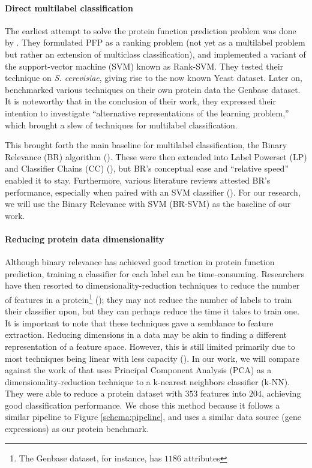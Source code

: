 \paragraph{Direct multilabel classification} The earliest attempt to solve
the protein function prediction problem was done by
\cite{elisseeff2001kernel}. They formulated PFP as a ranking problem (not yet
as a multilabel problem but rather an extension of multiclass
classification), and implemented a variant of the support-vector machine
(SVM) known as Rank-SVM. They tested their technique on \textit{S.
cerevisiae}, giving rise to the now known Yeast dataset. Later on,
\cite{diplaris2005protein} benchmarked various techniques on their own
protein data \textemdash the Genbase dataset. It is noteworthy that
in the conclusion of their work, they expressed their intention to
investigate ``alternative representations of the learning problem,'' which
brought a slew of techniques for multilabel classification.

\par This brought forth the main baseline for multilabel classification, the
Binary Relevance (BR) algorithm
(\cite{godbole2004discriminative,tsoumakas2007multilabel}). These were then
extended into Label Powerset (LP) and Classifier Chains (CC)
(\cite{read2009classifier}), but BR's conceptual ease and ``relative speed''
enabled it to stay. Furthermore, various literature reviews attested BR's
performance, especially when paired with an SVM classifier
(\cite{luaces2012binary, zhang2014review,tsoumakas2017data}). For our
research, we will use the Binary Relevance with SVM (BR-SVM) as the baseline
of our work.

\paragraph{Reducing protein data dimensionality} Although binary relevance
has achieved good traction in protein function prediction, training a
classifier for each label can be time-consuming. Researchers have then
resorted to dimensionality-reduction techniques to reduce the number of
features in a protein\footnote{The Genbase dataset, for instance, has $1186$
attributes} (\cite{wang2009using, wang2013protein, wang2017protein}); they
may not reduce the number of labels to train their classifier upon, but they
can perhaps reduce the time it takes to train one. It is important to note
that these techniques gave a semblance to feature extraction. Reducing
dimensions in a data may be akin to finding a different representation of a
feature space. However, this is still limited primarily due to most
techniques being linear with less capacity (\cite{cunningham2015linear}). In
our work, we will compare against the work of \cite{wang2013protein} that
uses Principal Component Analysis (PCA) as a dimensionality-reduction
technique to a k-nearest neighbors classifier (k-NN). They were able to
reduce a protein dataset with $353$ features into $204$, achieving good
classification performance. We chose this method because it follows a similar
pipeline to Figure \ref{schema:pipeline}, and uses a similar data source
(gene expressions) as our protein benchmark.


